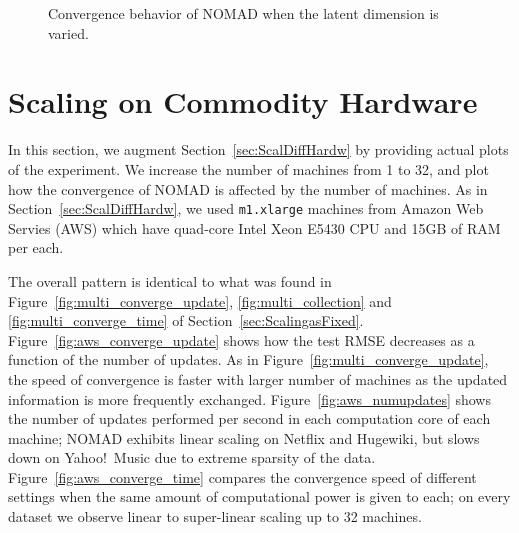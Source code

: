 \documentclass{vldb}
\begin{document}
\begin{figure*}[htbp]

  \caption{Convergence behavior of NOMAD when the latent dimension 
    is varied.}
  \label{fig:vary_dimension}
\end{figure*}




\section{Scaling on Commodity Hardware}
\label{app:ScalDiffHardw}

In this section, we augment Section~\ref{sec:ScalDiffHardw} by
providing actual plots of the experiment.  We increase the number of
machines from 1 to 32, and plot how the convergence of NOMAD is
affected by the number of machines.  As in
Section~\ref{sec:ScalDiffHardw}, we used \texttt{m1.xlarge} machines
from Amazon Web Servies (AWS) which have quad-core Intel Xeon E5430
CPU and 15GB of RAM per each.

The overall pattern is identical to what was found in
Figure~\ref{fig:multi_converge_update}, \ref{fig:multi_collection} and
\ref{fig:multi_converge_time} of Section~\ref{sec:ScalingasFixed}.
Figure~\ref{fig:aws_converge_update} shows how the test RMSE decreases
as a function of the number of updates.  As in
Figure~\ref{fig:multi_converge_update}, the speed of convergence is
faster with larger number of machines as the updated information is more
frequently exchanged.  Figure~\ref{fig:aws_numupdates} shows the number
of updates performed per second in each computation core of each
machine; NOMAD exhibits linear scaling on Netflix and Hugewiki, but
slows down on Yahoo!~Music due to extreme sparsity of the data.
Figure~\ref{fig:aws_converge_time} compares the convergence speed of
different settings when the same amount of computational power is given
to each; on every dataset we observe linear to super-linear scaling up
to 32 machines.
\end{document}

